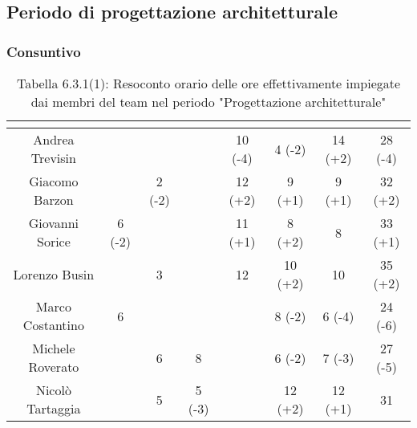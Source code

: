\subsection{Periodo di progettazione architetturale}
\subsubsection{Consuntivo}
\renewcommand{\arraystretch}{1.5}
\begin{table}[H]
\begin{center}
\begin{tabular}{|c|c|c|c|c|c|c|c|}
\hline
\rowcolor{title_row}
\textbf{\color{title_text}{Nome}} & \textbf{\color{title_text}{Resp.}} & \textbf{\color{title_text}{Ammi.}} & \textbf{\color{title_text}{Analist.}} & \textbf{\color{title_text}{Progett.}} & \textbf{\color{title_text}{Program.}} & \textbf{\color{title_text}{Verific.}} & \textbf{\color{title_text}{Totale}} \\ \hline
Andrea Trevisin  & & & & 10 (-4) & 4 (-2) & 14 (+2) & 28 (-4) \\ \hline     %
Giacomo Barzon   & & 2 (-2) & & 12 (+2) & 9 (+1) & 9 (+1) & 32 (+2)  \\ \hline
Giovanni Sorice  & 6 (-2) & & & 11 (+1) & 8 (+2) & 8 & 33 (+1)  \\ \hline
Lorenzo Busin    & & 3 & & 12 & 10 (+2) & 10 & 35 (+2) \\ \hline
Marco Costantino & 6 & & & & 8 (-2) & 6 (-4) & 24 (-6) \\ \hline     %
Michele Roverato & & 6 & 8 & & 6 (-2) & 7 (-3) & 27 (-5) \\ \hline    %
Nicolò Tartaggia & & 5 & 5 (-3) & & 12 (+2) & 12 (+1) & 31  \\ \hline
\end{tabular}
\caption{Tabella 6.3.1(1): Resoconto orario delle ore effettivamente impiegate dai membri del team nel periodo "Progettazione architetturale"\label{}}
\end{center}
\end{table}
\renewcommand{\arraystretch}{1}

